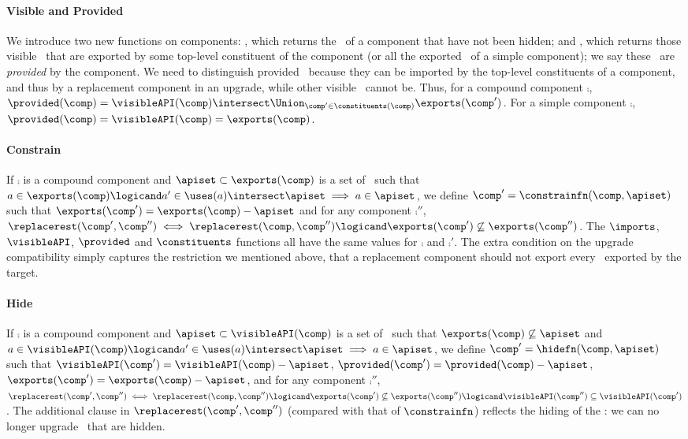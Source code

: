 \paragraph{Visible and Provided}
We introduce two new functions on components:
\visibleAPI, which returns the \apisN\ of a component that have not been
hidden; 
and \provided, which returns those visible \apisN\ that are exported
by some top-level constituent of the component
(or all the exported \apisN\ of a simple component);
we say these \apisN\ are \emph{provided} by the component.
We need to distinguish provided \apisN\
because they can be imported by the top-level constituents of a component,
and thus by a replacement component in an upgrade,
while other visible \apisN\ cannot be.
Thus, for a compound component $\comp$,
$\provided(\comp) = \visibleAPI(\comp) \intersect
                        \Union_{\comp' \in \constituents(\comp)} \exports(\comp')$.
For a simple component $\comp$,
$\provided(\comp) = \visibleAPI(\comp) = \exports(\comp)$.

\paragraph{Constrain}
If $\comp$ is a compound component
and $\apiset \subset \exports(\comp)$ is a set of \apisN\
such that
$\api \in \exports(\comp) \logicand \api' \in \uses(\api) \intersect \apiset
        \implies \api \in \apiset$,
we define $\comp' = \constrainfn(\comp,\apiset)$
such that $\exports(\comp') = \exports(\comp) - \apiset$
and for any component $\comp''$,
$\replacerest(\comp',\comp'')
  \iff \replacerest(\comp,\comp'') \logicand
                \exports(\comp') \not\subseteq \exports(\comp'')$.
The $\imports$, $\visibleAPI$, $\provided$ and $\constituents$ functions
all have the same values for $\comp$ and $\comp'$.
The extra condition on the upgrade compatibility
simply captures the restriction we mentioned above,
that a replacement component should not export every \apiN\
exported by the target.

\paragraph{Hide}
If $\comp$ is a compound component
and $\apiset \subset \visibleAPI(\comp)$ is a set of \apisN\
such that $\exports(\comp) \not\subseteq \apiset$
and $\api \in \visibleAPI(\comp) \logicand \api'\in\uses(\api)
 \intersect \apiset        \implies \api \in \apiset$,
we define $\comp' = \hidefn(\comp,\apiset)$
such that $\visibleAPI(\comp') = \visibleAPI(\comp) - \apiset$,
$\provided(\comp') = \provided(\comp) - \apiset$,
$\exports(\comp') = \exports(\comp) - \apiset$,
and for any component $\comp''$,
$\replacerest(\comp',\comp'')
  \iff \replacerest(\comp,\comp'') \logicand
                \exports(\comp') \not\subseteq \exports(\comp'')
        \logicand \visibleAPI(\comp'') \subseteq \visibleAPI(\comp')$.
The additional clause in $\replacerest(\comp',\comp'')$
(compared with that of $\constrainfn$)
reflects the hiding of the \apisN:
we can no longer upgrade \apisN\ that are hidden.


